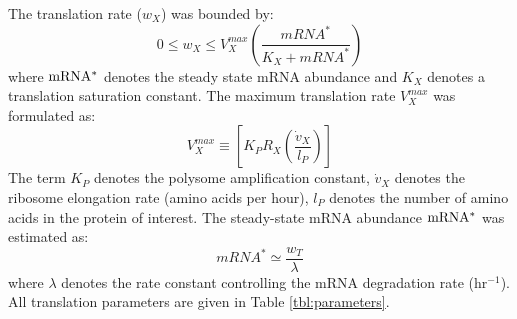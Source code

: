 \documentclass[journal=asbcd6,manuscript=article]{achemso}
\begin{document}
The translation rate ($w_{X}$) was bounded by:
 \begin{equation}
	0\leq w_{X} \leq V_{X}^{max}\left(\frac{mRNA^{*}}{K_{X}+mRNA^{*}}\right)
\end{equation}
where $\rm mRNA^{*}$ denotes the steady state mRNA abundance and $K_{X}$ denotes a translation saturation constant.
The maximum translation rate $V_{X}^{max}$ was formulated as:
\begin{equation}
	V_{X}^{max} \equiv \left[K_{P} R_{X}\left(\frac{\dot{v}_{X}}{l_{P}}\right)\right]
\end{equation}
The term $K_{P}$ denotes the polysome amplification constant,
$\dot{v}_{X}$ denotes the ribosome elongation rate (amino acids per hour),
$l_{P}$ denotes the number of amino acids in the protein of interest.
The steady-state mRNA abundance $\rm mRNA^{*}$ was estimated as:
\begin{equation}
	 mRNA^{*}\simeq\frac{w_{T}}{\lambda}
\end{equation}
where $\lambda$ denotes the rate constant controlling the mRNA degradation rate (hr$^{-1}$).
All translation parameters are given in Table \ref{tbl:parameters}.
\end{document}
